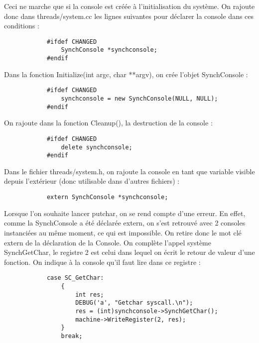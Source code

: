 \documentclass[a4paper,10pt]{article}
\begin{document}
        Ceci ne marche que si la console est créée à l'initialisation du système. On rajoute donc dans threads/system.cc les lignes suivantes pour déclarer la console dans ces conditions :
        \begin{lstlisting}
            #ifdef CHANGED
                SynchConsole *synchconsole;
            #endif
        \end{lstlisting}
        Dans la fonction Initialize(int argc, char **argv), on crée l'objet SynchConsole :
        \begin{lstlisting}
            #ifdef CHANGED
                synchconsole = new SynchConsole(NULL, NULL);
            #endif
            \end{lstlisting}
                On rajoute dans la fonction Cleanup(), la destruction de la console :
                \begin{lstlisting}
            #ifdef CHANGED
                delete synchconsole;
            #endif
        \end{lstlisting}
        Dans le fichier threads/system.h, on rajoute la console en tant que variable visible depuis l'extérieur (donc utilisable dans d'autres fichiers) :
        \begin{lstlisting}
            extern SynchConsole *synchconsole;
        \end{lstlisting}
        Lorsque l'on souhaite lancer putchar, on se rend compte d'une erreur. En effet, comme la SynchConsole a été déclarée extern, on s'est retrouvé avec 2 consoles instanciées au même moment, ce qui est impossible. On retire donc le mot clé extern de la déclaration de la Console.
        On complète l'appel système SynchGetChar, le registre 2 est celui dans lequel on écrit le retour de valeur d'une fonction. On indique à la console qu'il faut lire dans ce registre :
        \begin{lstlisting}
            case SC_GetChar:
                {
                    int res;
                    DEBUG('a', "Getchar syscall.\n");
                    res = (int)synchconsole->SynchGetChar();
                    machine->WriteRegister(2, res);
                }
                break;
        \end{lstlisting}
\end{document}
